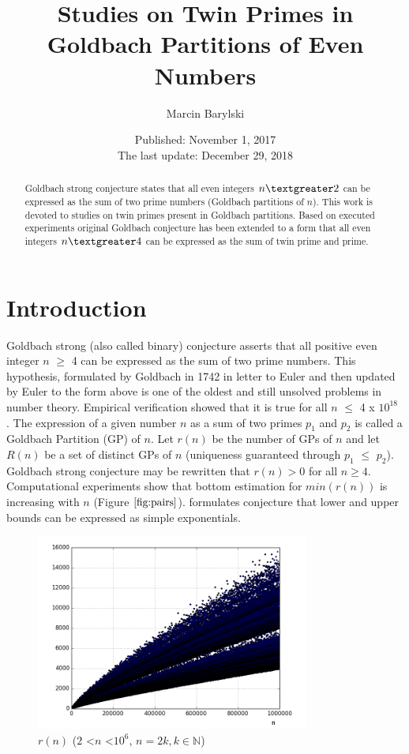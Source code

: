 \documentclass[10pt,twocolumn]{article}
\title{Studies on Twin Primes in Goldbach Partitions of Even Numbers}
\author{Marcin Barylski}
\date{\small{Published: November 1, 2017 \\The last update: December 29, 2018}}
\begin{document}
\maketitle

\begin{abstract}
Goldbach strong conjecture states that all even integers $n \textgreater 2$ can be expressed as the sum of two prime numbers (Goldbach partitions of $n$). This work is devoted to studies on twin primes present in Goldbach partitions. Based on executed experiments original Goldbach conjecture has been extended to a form that all even integers $n \textgreater 4$  can be expressed as the sum of twin prime and prime.
\end{abstract}

\section{Introduction}

Goldbach strong (also called binary) conjecture asserts that all positive even integer $n$ $\geq$ 4 can be expressed as the sum of two prime numbers. This hypothesis, formulated by Goldbach in 1742 in letter to Euler \cite{goldbach1742} and then updated by Euler to the form above is one of the oldest and still unsolved problems in number theory. Empirical verification showed that it is true for all $n$ $\leq$ 4 x $10^{18}$ \cite{oliveira2012} \cite{oliveira2013}.
The expression of a given number $n$ as a sum of two primes $p_1$ and $p_2$ is called a Goldbach Partition (GP) of $n$. Let $r(n)$ be the number of GPs of $n$ and let $R(n)$ be a set of distinct GPs of $n$ (uniqueness guaranteed through $p_1$  $\leq$ $p_2$). Goldbach strong conjecture may be rewritten that  $r(n) > 0$ for all $n \geq 4$. Computational experiments show that bottom estimation for $min(r(n))$ is increasing with $n$ (Figure $\ref{fig:pairs}$). \cite{woon2000} formulates conjecture that lower and upper bounds can be expressed as simple exponentials. \par

\begin{figure}[ht]
\centering
\captionsetup{justification=centering}
\includegraphics[width=9cm]{f_pairs}
\caption{$r(n)$ ($2$ \textless $n$ \textless $10^6$, $n = 2k, k \in \mathbb{N}$)}
\label{fig:pairs}
\end{figure}
\end{document}
